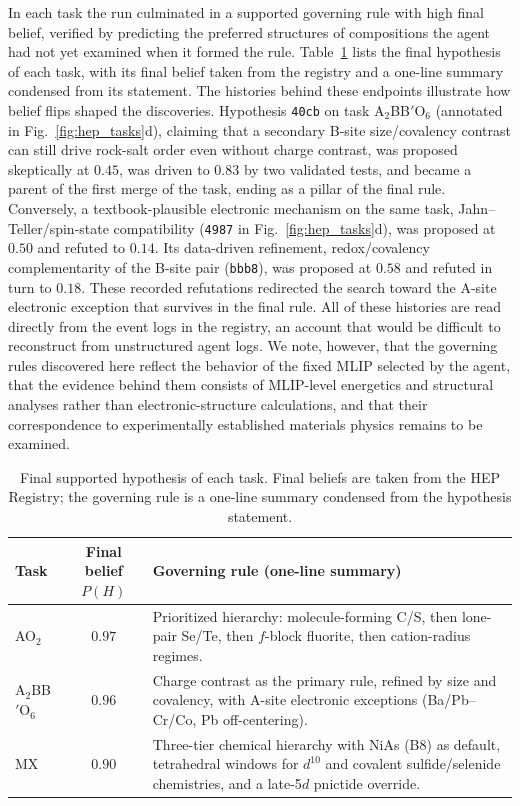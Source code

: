 In each task the run culminated in a supported governing rule with high
final belief, verified by predicting the preferred structures of
compositions the agent had not yet examined when it formed the rule.
Table~\ref{tab:final_hypotheses} lists the final hypothesis of each
task, with its final belief taken from the registry and a one-line
summary condensed from its statement.
The histories behind these endpoints illustrate how belief flips shaped
the discoveries.
Hypothesis \texttt{40cb} on task A$_2$BB$'$O$_6$ (annotated in
Fig.~\ref{fig:hep_tasks}d), claiming that a secondary B-site
size/covalency contrast can still drive rock-salt order even without
charge contrast, was proposed skeptically at $0.45$, was driven to
$0.83$ by two validated tests, and became a parent of the first merge
of the task, ending as a pillar of the final rule.
Conversely, a textbook-plausible electronic mechanism on the same
task, Jahn--Teller/spin-state compatibility (\texttt{4987} in
Fig.~\ref{fig:hep_tasks}d), was proposed at $0.50$ and refuted to
$0.14$.
Its data-driven refinement, redox/covalency complementarity of
the B-site pair (\texttt{bbb8}), was proposed at $0.58$ and refuted in
turn to $0.18$.
These recorded refutations redirected the search toward the A-site
electronic exception that survives in the final rule.
All of these histories are read directly from the event logs in the
registry, an account that would be difficult to reconstruct from
unstructured agent logs.
We note, however, that the governing rules discovered here reflect the
behavior of the fixed MLIP selected by the agent, that the evidence
behind them consists of MLIP-level energetics and structural analyses
rather than electronic-structure calculations, and that their
correspondence to experimentally established materials physics remains
to be examined.

\begin{table}[!htb]
    \centering
    \caption{%
        Final supported hypothesis of each task.
        Final beliefs are taken from the HEP Registry; the governing
        rule is a one-line summary condensed from the hypothesis
        statement.
    }
    \label{tab:final_hypotheses}
    \small
    \begin{tabular}{lcp{9.4cm}}
        \toprule
        Task & Final belief $P(H)$ &
        Governing rule (one-line summary) \\
        \midrule
        AO$_2$ & $0.97$ &
        Prioritized hierarchy: molecule-forming C/S, then lone-pair
        Se/Te, then $f$-block fluorite, then cation-radius regimes. \\
        A$_2$BB$'$O$_6$ & $0.96$ &
        Charge contrast as the primary rule, refined by size and
        covalency, with A-site electronic exceptions
        (Ba/Pb--Cr/Co, Pb off-centering). \\
        MX & $0.90$ &
        Three-tier chemical hierarchy with NiAs (B8) as default,
        tetrahedral windows for $d^{10}$ and covalent
        sulfide/selenide chemistries, and a late-5$d$ pnictide
        override. \\
        \bottomrule
    \end{tabular}
\end{table}

